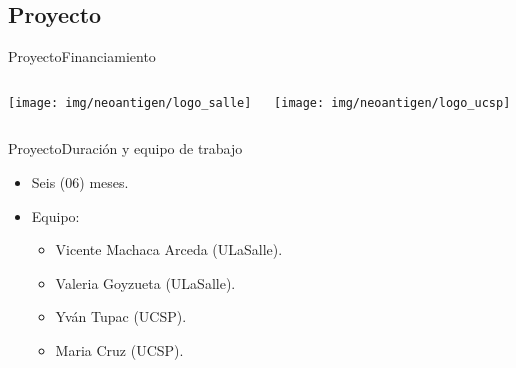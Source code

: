\documentclass[10pt]{beamer}
\newcommand{\1}{
	\setbeamertemplate{background}{
		\texttt{[image: img/1]}
		\tikz[overlay] \fill[fill opacity=0.75,fill=white] (0,0) rectangle (-\paperwidth,\paperheight);
	}
}
\begin{document}
\subsection{Proyecto}

\begin{frame}{Proyecto}{Financiamiento}		
	\begin{columns}
		\begin{column}{0.48\textwidth}
			\texttt{[image: img/neoantigen/logo\_salle]}
		\end{column}
	
		\begin{column}{0.48\textwidth}
			\texttt{[image: img/neoantigen/logo\_ucsp]}
		\end{column}
	\end{columns}		
\end{frame}

\begin{frame}{Proyecto}{Duración y equipo de trabajo}			
	\begin{block}{}
		\begin{itemize}
			\item Seis (06) meses.
			\item Equipo:
			\begin{itemize}
				\item Vicente Machaca Arceda (ULaSalle).
				\item Valeria Goyzueta (ULaSalle).
				\item Yván Tupac (UCSP).
				\item Maria Cruz (UCSP).				
			\end{itemize}
		\end{itemize}
	\end{block}
\end{frame}
\end{document}
